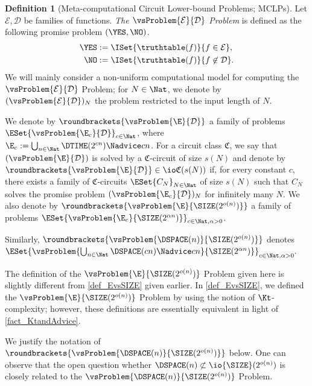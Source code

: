 \documentclass[11pt]{article}
\numberwithin{equation}{section}
\theoremstyle{definition}
\newtheorem{definition}[theorem]{Definition}
\theoremstyle{plain}
\begin{document}
\begin{definition}
  [Meta-computational Circuit Lower-bound Problems; MCLPs]
  Let $\mathcal{E}, \mathcal{D}$ be families of functions.
  \emph{The $\vsProblem{\mathcal{E}}{\mathcal{D}}$ Problem} is defined as the following promise problem $(\YES, \NO)$.
  \begin{align*}
    \YES & := \ISet{ \truthtable(f) }{ f \in \mathcal{E} },
    \\
    \NO  & := \ISet{ \truthtable(f) } { f \not\in \mathcal{D} }.
  \end{align*}
  We will mainly consider a non-uniform computational model for computing the $\vsProblem{\mathcal{E}}{\mathcal{D}}$ Problem;
  for $N \in \Nat$,
  we denote
  by $(\vsProblem{\mathcal{E}}{\mathcal{D}})_N$
  the problem restricted to the input length of $N$.

  We denote by $\roundbrackets{\vsProblem{\E}{\mathcal{D}}}$ a family of problems $\ESet { \vsProblem{\E_c }{\mathcal{D}} }_{c \in \Nat}$,
  where $\E_c := \bigcup_{n \in \Nat}  \DTIME(2^{c n}) \Nadvice c n$.
  For a circuit class $\mathfrak{C}$,
  we say that $(\vsProblem{\E}{\mathcal{D}})$ is solved by a $\mathfrak{C}$-circuit of size $s(N)$ and denote by
  $\roundbrackets{\vsProblem{\E}{\mathcal{D}}} \in \io\mathfrak{C}(s(N))$
  if, for every constant $c$, there exists a family of $\mathfrak{C}$-circuits $\ESet{ C_N }_{N \in \Nat}$ of size $s(N)$
  such that $C_N$ solves the promise problem $(\vsProblem{\E_c}{\mathcal{D}})_N$ for infinitely many $N$.
  We also denote by $\roundbrackets{\vsProblem{\E}{\SIZE(2^{o(n)})}}$
  a family of problems $\ESet{ \vsProblem{\E_c}{\SIZE(2^{\alpha n})} }_{c \in \Nat, \alpha > 0}$.

  Similarly, $\roundbrackets{\vsProblem{\DSPACE(n)}{\SIZE(2^{o(n)})}}$ denotes $\ESet { \vsProblem{\bigcup_{n \in \Nat}\DSPACE(c n) \Nadvice c n}{\SIZE(2^{\alpha n})} }_{c \in \Nat, \alpha > 0}.$
\end{definition}

The definition of the $\vsProblem{\E}{\SIZE(2^{o(n)})}$ Problem given here is slightly different from \cref{def_EvsSIZE} given earlier.
In \cref{def_EvsSIZE}, we defined the $\vsProblem{\E}{\SIZE(2^{o(n)})}$ Problem by using the notion of $\Kt$-complexity;
however,
these definitions are essentially equivalent in light of \cref{fact_KtandAdvice}.

We justify the notation of $\roundbrackets{\vsProblem{\DSPACE(n)}{\SIZE(2^{o(n)})}}$ below.
One can observe that
the open question %
%
whether $\DSPACE(n) \not\subset \io{\SIZE}(2^{o(n)})$
is closely related to the ${\vsProblem{\DSPACE(n)}{\SIZE(2^{o(n)})}}$ Problem.
%
%
\end{document}
